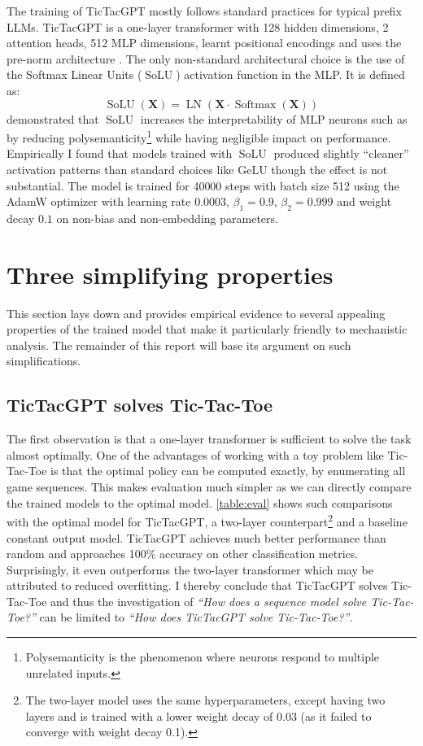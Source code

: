 \documentclass{article}
\newcommand{\ttgpt}{TicTacGPT\xspace}
\newcommand{\ttt}{Tic-Tac-Toe\xspace}
\newcommand{\m}[1]{\mathbf{\bm{#1}}}
\DeclareMathOperator{\softmax}{Softmax}
\DeclareMathOperator{\solu}{SoLU}
\DeclareMathOperator{\layernorm}{LN}
\newcounter{num}
\begin{document}
The training of \ttgpt mostly follows standard practices \citep{radford2019language} for typical prefix \ac{LLMs}. \ttgpt is a one-layer transformer with 128 hidden dimensions, 2 attention heads, 512 MLP dimensions, learnt positional encodings and uses the pre-norm architecture \citep{xiong2020layer}. The only non-standard architectural choice is the use of the Softmax Linear Units ($\solu$) \citep{elhage2022solu} activation function in the MLP. It is defined as:
\begin{equation*}
    \solu(\m{X}) = \layernorm(\m{X} \cdot \softmax(\m{X}))
\end{equation*}
\citet{elhage2022solu} demonstrated that $\solu$ increases the interpretability of MLP neurons such as by reducing polysemanticity\footnote{Polysemanticity is the phenomenon where neurons respond to multiple unrelated inputs.}\citep{olah2020zoom} while having negligible impact on performance. Empirically I found that models trained with $\solu$ produced slightly ``cleaner'' activation patterns than standard choices like $\text{GeLU}$ though the effect is not substantial. The model is trained for 40000 steps with batch size 512 using the AdamW optimizer \citep{loshchilov2017decoupled} with learning rate $0.0003$, $\beta_1 = 0.9$, $\beta_2 = 0.999$ and weight decay $0.1$ on non-bias and non-embedding parameters.

\section{Three simplifying properties} \label{sec:simplify}



This section lays down and provides empirical evidence to several appealing properties of the trained model that make it particularly friendly to mechanistic analysis. The remainder of this report will base its argument on such simplifications.

\subsection{\ttgpt solves \ttt}

The first observation is that a one-layer transformer is sufficient to solve the task almost optimally. One of the advantages of working with a toy problem like \ttt is that the optimal policy can be computed exactly, by enumerating all game sequences. This makes evaluation much simpler as we can directly compare the trained models to the optimal model. \cref{table:eval} shows such comparisons with the optimal model for \ttgpt, a two-layer counterpart\footnote{The two-layer model uses the same hyperparameters, except having two layers and is trained with a lower weight decay of 0.03 (as it failed to converge with weight decay 0.1).} and a baseline constant output model. \ttgpt achieves much better performance than random and approaches 100\% accuracy on other classification metrics. Surprisingly, it even outperforms the two-layer transformer which may be attributed to reduced overfitting. I thereby conclude that \ttgpt solves \ttt and thus the investigation of \emph{``How does a sequence model solve \ttt?''} can be limited to \emph{``How does \ttgpt solve \ttt?''}.
\end{document}
